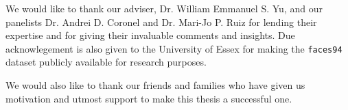 \begin{acknowledgments}

    \noindent
    We would like to thank our adviser, Dr. William Emmanuel S. Yu, and our panelists Dr. Andrei D. Coronel and Dr. Mari-Jo P. Ruiz for lending their expertise and for giving their invaluable comments and insights.
Due acknowlegement is also given to the University of Essex for making the \texttt{faces94} dataset publicly available for research purposes.

    We would also like to thank our friends and families who have given us motivation and utmost support to make this thesis a successful one.



\end{acknowledgments}
